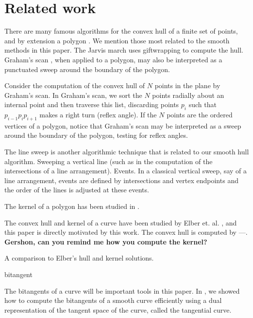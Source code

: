 \documentclass[12pt]{article}
\begin{document}
\clearpage


\section{Related work}

There are many famous algorithms for the convex hull of a finite set of points,
and by extension a polygon \cite{preparata85}.
We mention those most related to the smooth methods in this paper.
The Jarvis march \cite{jarvis73} uses giftwrapping to compute the hull.
Graham's scan \cite{graham72}, when applied to a polygon,
may also be interpreted as a punctuated sweep around the boundary of the
polygon.

Consider the computation of the convex hull of $N$ points in the plane
by Graham's scan.
In Graham's scan, we sort the $N$ points radially about an internal point
and then traverse this list, discarding points $p_i$ such that
$p_{i-1} p_i p_{i+1}$ makes a right turn (reflex angle).
If the $N$ points are the ordered vertices of a polygon,
notice that Graham's scan may be interpreted as a sweep around 
the boundary of the polygon, testing for reflex angles.

The line sweep \cite{edelsbrunner,mehlhorn}
is another algorithmic technique that is related to 
our smooth hull algorithm.
Sweeping a vertical line (such as in the computation
of the intersections of a line arrangement).
Events.
In a classical vertical sweep, say of a line arrangement, events are
defined by intersections and vertex endpoints and the order of the lines 
is adjusted at these events.

The kernel of a polygon has been studied in \cite{lee79}.

The convex hull and kernel of a curve have been studied by Elber et. al.
\cite{elber01,elber02},
and this paper is directly motivated by this work.
The convex hull is computed by ---.
{\bf Gershon, can you remind me how you compute the kernel?}

A comparison to Elber's hull and kernel solutions.

\begin{defn2}
bitangent
\end{defn2}

The bitangents of a curve will be important tools in this paper.
In \cite{jj01}, we showed how to compute the bitangents of a smooth curve
efficiently using a dual representation of the tangent space of the curve, 
called the tangential curve.
\end{document}
